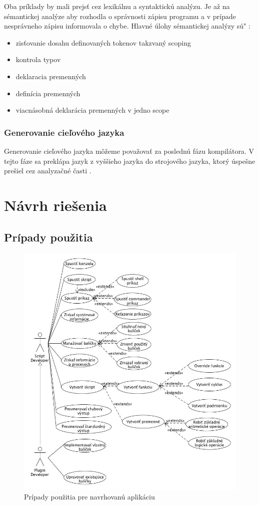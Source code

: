 Oba príklady by mali prejsť cez lexikálnu a syntaktickú analýzu. Je až na sémantickej analýze aby rozhodla o správnosti zápisu programu a v prípade nesprávneho zápisu informovala o chybe.  Hlavné úlohy sémantickej analýzy sú" :

\begin{itemize}
	\item zisťovanie dosahu definovaných tokenov takzvaný scoping
	\item kontrola typov
	\item deklaracia premenných
	\item definícia premenných
	\item viacnásobná deklarácia premenných v jedno scope
\end{itemize}

\subsubsection{Generovanie cieľového jazyka}
\indent Generovanie cieľového jazyka môžeme považovať za poslednú fázu kompilátora. V tejto fáze sa preklápa jazyk z vyššieho jazyka do strojového jazyka, ktorý úspešne prešiel cez analyzačné časti .\cite{gram}

\section{Návrh riešenia}
\subsection{Prípady použitia}
\begin{figure}[!htbp]
	\centering
	\includegraphics[width=\linewidth]{img/usecase.jpg}
	\caption{Prípady použitia pre navrhovanú aplikáciu}
	\label{fig:test}
\end{figure}
\newpage
